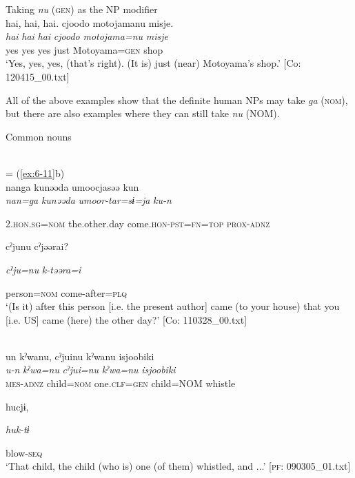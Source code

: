 \begin{table}
\begin{styleBeschriftung}
\ex Taking \textit{nu} (\textsc{gen}) as the NP modifier\\
{\TM}
\glll  {\textbar}hai,  hai,  hai{\textbar}.  cjoodo  motojamanu  misje.\\
\textit{hai}  \textit{hai}  \textit{hai}  \textit{cjoodo}  \textit{motojama=nu}  \textit{misje}\\
yes  yes  yes  just  Motoyama=\textsc{gen}  shop\\
\glt ‘Yes, yes, yes, (that’s right). (It is) just (near) Motoyama’s shop.’ [Co: 120415\_00.txt]
\z

  All of the above examples show that the definite human NPs may take \textit{ga} (\textsc{nom}), but there are also examples where they can still take \textit{nu} (NOM).

\ea\label{ex:6-135}
  Common nouns

 \ea{}\\
\glll = (\ref{ex:6-11}b)\\

{\TM}
\glll nanga  kunəəda  umoocjasəə  kun\\

      \textit{nan=ga}  \textit{kunəəda}  \textit{umoor-tar=sɨ=ja}  \textit{ku-n}

      2.\textsc{hon}.\textsc{sg}=\textsc{nom}  the.other.day  come.\textsc{hon}-\textsc{pst}=\textsc{fn}=\textsc{top}  \textsc{prox}-\textsc{adnz}

      cˀjunu  cˀjəərai?

      \textit{cˀju=nu}  \textit{k-təəra=i}

      person=\textsc{nom}  come-after=\textsc{plq}\\
\glt ‘(Is it) after this person [i.e. the present author] came (to your house) that you [i.e. US] came (here) the other day?’ [Co: 110328\_00.txt]
\z

\ex{}\\
{\TM}
\glll  un  kˀwanu,  cˀjuinu  kˀwanu  isjoobiki\\
\textit{u-n}  \textit{kˀwa=nu}  \textit{cˀjui=nu}  \textit{kˀwa=nu}  \textit{isjoobiki}\\
\textsc{mes}-\textsc{adnz}  child=\textsc{nom}  one.\textsc{clf}=\textsc{gen}  child=NOM  whistle

      hucjɨ,

      \textit{huk-tɨ}

      blow-\textsc{seq}\\
\glt ‘That child, the child (who is) one (of them) whistled, and ...’ [\textsc{pf}: 090305\_01.txt]
\z


\end{styleBeschriftung}
\end{table}

